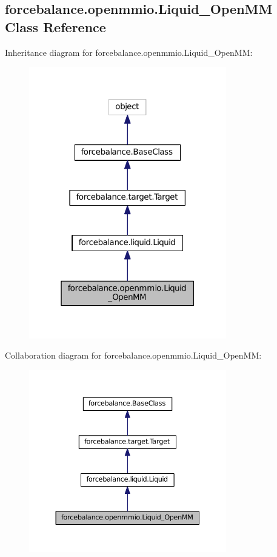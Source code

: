 \hypertarget{classforcebalance_1_1openmmio_1_1Liquid__OpenMM}{\subsection{forcebalance.\-openmmio.\-Liquid\-\_\-\-Open\-M\-M Class Reference}
\label{classforcebalance_1_1openmmio_1_1Liquid__OpenMM}
}


Inheritance diagram for forcebalance.\-openmmio.\-Liquid\-\_\-\-Open\-M\-M\-:\nopagebreak
\begin{figure}[H]
\begin{center}
\leavevmode
\includegraphics[width=244pt]{classforcebalance_1_1openmmio_1_1Liquid__OpenMM__inherit__graph}
\end{center}
\end{figure}


Collaboration diagram for forcebalance.\-openmmio.\-Liquid\-\_\-\-Open\-M\-M\-:\nopagebreak
\begin{figure}[H]
\begin{center}
\leavevmode
\includegraphics[width=244pt]{classforcebalance_1_1openmmio_1_1Liquid__OpenMM__coll__graph}
\end{center}
\end{figure}
